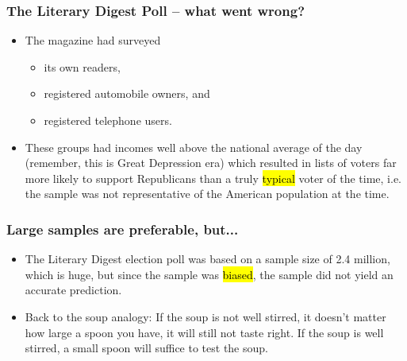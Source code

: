 
\begin{frame}
\frametitle{The Literary Digest Poll -- what went wrong?}

\begin{itemize}

\item The magazine had surveyed

\begin{itemize}

\item its own readers,

\item registered automobile owners, and

\item registered telephone users.

\end{itemize}

\item These groups had incomes well above the national average of the day (remember, this is Great Depression era) which resulted in lists of voters far more likely to support Republicans than a truly \hl{typical} voter of the time, i.e. the sample was not representative of the American population at the time.

\end{itemize}

\end{frame}


\begin{frame}
\frametitle{Large samples are preferable, but...}

\begin{itemize}

\item The Literary Digest election poll was based on a sample size of 2.4 million, which is huge, but since the sample was \hl{biased}, the sample did not yield an accurate prediction.

\item Back to the soup analogy: If the soup is not well stirred, it doesn't matter how large a spoon you have, it will still not taste right. If the soup is well stirred, a small spoon will suffice to test the soup.

\end{itemize}

\end{frame}


